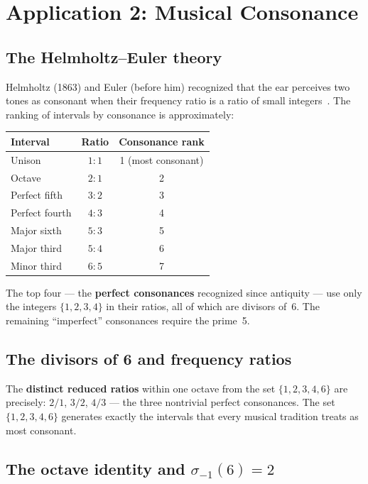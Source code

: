 \documentclass[preprint]{revtex4-2}
\begin{document}
\section{Application 2: Musical Consonance}\label{sec:music}

\subsection{The Helmholtz--Euler theory}

Helmholtz (1863) and Euler (before him) recognized that the ear perceives two tones as consonant when their frequency ratio is a ratio of small integers~\cite{helmholtz}. The ranking of intervals by consonance is approximately:

\begin{center}
\begin{tabular}{lcc}
\toprule
Interval & Ratio & Consonance rank \\
\midrule
Unison & $1{:}1$ & 1 (most consonant) \\
Octave & $2{:}1$ & 2 \\
Perfect fifth & $3{:}2$ & 3 \\
Perfect fourth & $4{:}3$ & 4 \\
Major sixth & $5{:}3$ & 5 \\
Major third & $5{:}4$ & 6 \\
Minor third & $6{:}5$ & 7 \\
\bottomrule
\end{tabular}
\end{center}

The top four --- the \textbf{perfect consonances} recognized since antiquity --- use only the integers $\{1, 2, 3, 4\}$ in their ratios, all of which are divisors of~6. The remaining ``imperfect'' consonances require the prime~5.

\subsection{The divisors of 6 and frequency ratios}

The \textbf{distinct reduced ratios} within one octave from the set $\{1,2,3,4,6\}$ are precisely: $2/1$, $3/2$, $4/3$ --- the three nontrivial perfect consonances. The set $\{1,2,3,4,6\}$ generates exactly the intervals that every musical tradition treats as most consonant.

\subsection{The octave identity and $\sigma_{-1}(6) = 2$}
\end{document}
